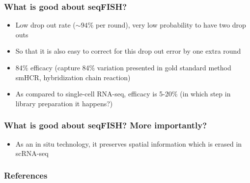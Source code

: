 \documentclass{beamer}
\begin{document}
  \begin{frame}
  \frametitle{What is good about seqFISH?}
  \begin{itemize}
    \item Low drop out rate ($\sim 94\%$ per round), very low probability to have two drop outs
    \item So that it is also easy to correct for this drop out error by one extra round
    \item 84\% efficacy (capture 84\% variation presented in gold standard method smHCR, hybridization chain reaction)
    \item As compared to single-cell RNA-seq, efficacy is 5-20\% (in which step in library preparation it happens?)
  \end{itemize}
  \cite{shah2016situ}
  \end{frame}

  \begin{frame}
  \frametitle{What is good about seqFISH? More importantly?}
  \begin{itemize}
    \item As an in situ technology, it preserves spatial information which is erased in scRNA-seq
  \end{itemize}
  \cite{shah2016situ}
  \end{frame}



\begin{frame}[allowframebreaks]
\frametitle{References}
\footnotesize


\end{frame}

\end{document}
